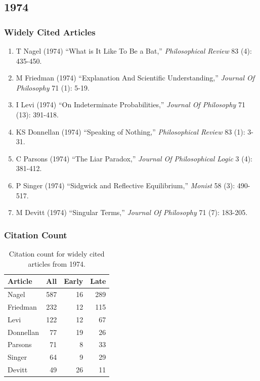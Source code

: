 \documentclass[
  10pt,
  letterpaper,
  DIV=11,
  numbers=noendperiod,
  twoside]{scrartcl}
\providecommand{\tightlist}{%
  \setlength{\itemsep}{0pt}\setlength{\parskip}{0pt}}\usepackage{longtable,booktabs,array}
\begin{document}
\newpage

\subsection{1974}\label{sec-s1974}

\subsubsection*{Widely Cited Articles}\label{widely-cited-articles-18}

\begin{enumerate}
\def\labelenumi{\arabic{enumi}.}
\tightlist
\item
  T Nagel (1974) ``What is It Like To Be a Bat,'' \emph{Philosophical
  Review} 83 (4): 435-450.
\item
  M Friedman (1974) ``Explanation And Scientific Understanding,''
  \emph{Journal Of Philosophy} 71 (1): 5-19.
\item
  I Levi (1974) ``On Indeterminate Probabilities,'' \emph{Journal Of
  Philosophy} 71 (13): 391-418.
\item
  KS Donnellan (1974) ``Speaking of Nothing,'' \emph{Philosophical
  Review} 83 (1): 3-31.
\item
  C Parsons (1974) ``The Liar Paradox,'' \emph{Journal Of Philosophical
  Logic} 3 (4): 381-412.
\item
  P Singer (1974) ``Sidgwick and Reflective Equilibrium,'' \emph{Monist}
  58 (3): 490-517.
\item
  M Devitt (1974) ``Singular Terms,'' \emph{Journal Of Philosophy} 71
  (7): 183-205.
\end{enumerate}

\subsubsection*{Citation Count}\label{sec-count-1974}

\begin{longtable}[]{@{}lrrr@{}}

\caption{\label{tbl-citation-count-1974}Citation count for widely cited
articles from 1974.}

\tabularnewline

\toprule\noalign{}
Article & All & Early & Late \\
\midrule\noalign{}
\endhead
\bottomrule\noalign{}
\endlastfoot
Nagel & 587 & 16 & 289 \\
Friedman & 232 & 12 & 115 \\
Levi & 122 & 12 & 67 \\
Donnellan & 77 & 19 & 26 \\
Parsons & 71 & 8 & 33 \\
Singer & 64 & 9 & 29 \\
Devitt & 49 & 26 & 11 \\

\end{longtable}
\end{document}
